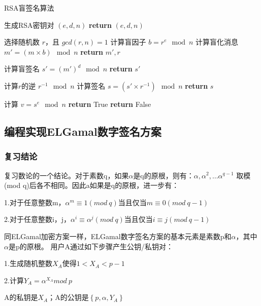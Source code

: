 \documentclass[a4paper,11pt,UTF8]{ctexart}
\begin{document}
                \begin{algorithm}
                  \caption{RSA盲签名算法}
                  \begin{algorithmic}[1]
                  
                      \State 生成RSA密钥对 $(e, d, n)$
                      \State \textbf{return} $(e, d, n)$
                  \EndProcedure
                  
                      \State 选择随机数 $r$，且 $gcd(r, n) = 1$
                      \State 计算盲因子 $b = r^e \mod n$
                      \State 计算盲化消息 $m' = (m \times b) \mod n$
                      \State \textbf{return} $m', r$
                  \EndProcedure
                  
                      \State 计算盲签名 $s' = (m')^d \mod n$
                      \State \textbf{return} $s'$
                  \EndProcedure
                  
                      \State 计算$r$的逆 $r^{-1} \mod n$
                      \State 计算签名 $s = (s' \times r^{-1}) \mod n$
                      \State \textbf{return} $s$
                  \EndProcedure
                  
                      \State 计算 $v = s^e \mod n$
                          \State \textbf{return} True
                      \Else
                          \State \textbf{return} False
                      \EndIf
                  \EndProcedure
                  
                  \end{algorithmic}
                  \end{algorithm}
\newpage                
    \subsection{编程实现ELGamal数字签名方案}
        \subsubsection{复习结论}
          复习数论的一个结论。对于素数q，如果$\alpha $是q的原根，则有：$\alpha ,\alpha ^{2},\dots \alpha ^{q-1}$
          取模(mod q)后各不相同。因此a如果是q的原根，进一步有：\par
          1.对于任意整数m，$\alpha ^{m}\equiv 1(mod\ q)$当且仅当$m\equiv 0(mod\ q-1)$\par
          2.对于任意整数i，j，$\alpha ^{i}\equiv \alpha ^{j}(mod\ q)$当且仅当$i\equiv j(mod\ q-1)$\par
          同ELGamal加密方案一样，ELGamal数字签名方案的基本元素是素数p和$\alpha $，其中$\alpha $是p的原根。
          用户A通过如下步骤产生公钥/私钥对：\par
          1.生成随机整数$X_{A}$使得$1<X_{A}<p-1$\par
          2.计算$Y_{A}=\alpha ^{X_{A}}mod\ p$\par
          A的私钥是$X_{A}$；A的公钥是$\left \{ p,\alpha ,Y_{A} \right \} $
\end{document}

